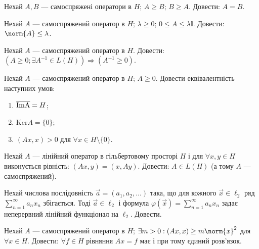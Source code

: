 
\begin{exercise}
    Нехай $A, B$ --- самоспряжені оператори в $H$; $A \geq B$; $B \geq A$.
    Довести: $A = B$.
\end{exercise}

\begin{exercise}
    Нехай $A$ --- самоспряжений оператор в $H$; $\lambda \geq 0$; $0 \leq A \leq \lambda \mathbb{I}$.
    Довести: $\norm{A} \leq \lambda$.
\end{exercise}

\begin{exercise}
    Нехай $A$ --- самоспряжений оператор в $H$. Довести:
    $ (A \geq 0; \exists A^{-1} \in L(H)) \Rightarrow (A^{-1} \geq 0)$.
\end{exercise}

\begin{exercise}
    Нехай $A$ --- самоспряжений оператор в $H$; $A \geq 0$. Довести еквівалентність наступних умов:
    \begin{enumerate}[label=\ukr*)]
        \item $\overline{\rm \mathrm{Im}A} = H$;
        \item $\mathrm{Ker}A = \{0\}$;
        \item $(Ax, x) > 0$ для $\forall x \in H \setminus \{0\}$.
    \end{enumerate}
\end{exercise}

\begin{exercise}
    Нехай $A$ --- лінійний оператор в гільбертовому просторі $H$ і для $\forall x, y \in H$ виконується
    рівність: $(Ax, y) = (x, Ay)$. Довести: $A \in L(H)$ (а тому $A$ --- самоспряжений).
\end{exercise}

\begin{exercise}
    Нехай числова послідовність $\vec{a} = (a_1, a_2, \dots)$ така, що для кожного $\vec{x} \in \ell_2$
    ряд $\sum\limits_{n = 1}^\infty a_n x_n$ збігається. Тоді $\vec{a} \in \ell_2$ і формула 
    $\varphi(\vec{x}) = \sum\limits_{n = 1}^\infty a_n x_n$ задає неперервний лінійний функціонал на $\ell_2$.
    Довести.
\end{exercise}

\begin{exercise}\label{N:1_3_41}
    Нехай $A$ --- самоспряжений оператор в $H$; $\exists m > 0: (Ax, x) \geq m \norm{x}^2$ для $\forall x \in H$.
    Довести: $\forall f \in H$ рівняння $Ax = f$ має і при тому єдиний розв'язок.
\end{exercise}

